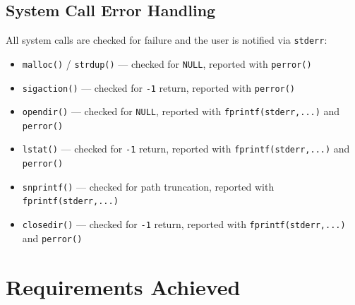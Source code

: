 \documentclass[12pt,a4paper]{article}
\begin{document}
\subsection{System Call Error Handling}

All system calls are checked for failure and the user is notified via \texttt{stderr}:

\begin{itemize}[nosep]
    \item \texttt{malloc()} / \texttt{strdup()} --- checked for \texttt{NULL}, reported with \texttt{perror()}
    \item \texttt{sigaction()} --- checked for \texttt{-1} return, reported with \texttt{perror()}
    \item \texttt{opendir()} --- checked for \texttt{NULL}, reported with \texttt{fprintf(stderr,...)} and \texttt{perror()}
    \item \texttt{lstat()} --- checked for \texttt{-1} return, reported with \texttt{fprintf(stderr,...)} and \texttt{perror()}
    \item \texttt{snprintf()} --- checked for path truncation, reported with \texttt{fprintf(stderr,...)}
    \item \texttt{closedir()} --- checked for \texttt{-1} return, reported with \texttt{fprintf(stderr,...)} and \texttt{perror()}
\end{itemize}

\section{Requirements Achieved}
\end{document}
